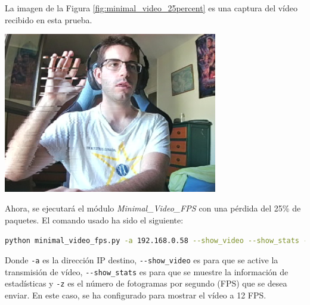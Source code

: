 \newpage
La imagen de la Figura \ref{fig:minimal_video_25percent} es una captura del vídeo recibido en esta prueba.
\begin{center}
  \includegraphics[width = 0.7\textwidth]{images/VideoRecibido8.1.png}
  \label{fig:minimal_video_25percent}
\end{center}

\newpage


Ahora, se ejecutará el módulo \textit{Minimal\_Video\_FPS} con una pérdida del 25\% de paquetes. El comando usado ha sido el siguiente:

\begin{lstlisting}[language=bash, basicstyle=\ttfamily\scriptsize]
    python minimal_video_fps.py -a 192.168.0.58 --show_video --show_stats -z 12
\end{lstlisting}
Donde \verb|-a| es la dirección IP destino, \verb|--show_video| es para que se active la transmisión de vídeo, \verb|--show_stats| es para que se muestre la información de estadísticas y \verb|-z| es el número de fotogramas por segundo (FPS) que se desea enviar. En este caso, se ha configurado para mostrar el vídeo a 12 FPS.
\vspace{\baselineskip}

